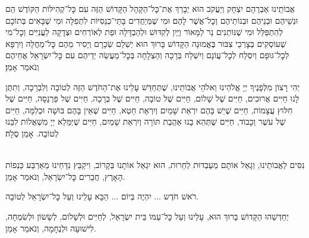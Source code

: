 \documentclass[twoside, openany, parskip=half, 11pt]{book}
\begin{document}
אֲבוֹתֵֽינוּ אַבְרָהָם יִצְחָק וְיַעֲקֹב הוּא יְבָרֵךְ אֶת־כׇּל־הַקָּהָל הַקָּדוֹשׁ הַזֶּה עִם כׇּל־קְהִילּוֹת הַקּוֹדֶשׁ הֵם וּנְשֵׁיהֶם וּבְנֵיהֶם וּבְנוֹתֵיהֶם וְכׇל־אֲשֶׁר לָהֶם׃ וּמִי שֶׁמְּיַחֲדִים בָּתֵּי־כְנֵסִיּוֹת לִתְפִלָּה וּמִי שֶׁבָּאִים בְּתוֹכָם לְהִתְפַּלֵּל וּמִי שֶׁנּוֹתְנִים נֵר לַמָּאוֹר וְיַֽיִן לְקִדּוּשׁ וּלְהַבְדָּלָה וּפַת לְאוֹרְחִים וּצְדָקָה לַעֲנִיִּים וְכׇל־מִי שֶׁעוֹסְקִים בְּצׇרְכֵי צִבּוּר בֶּאֱמוּנָה הַקָּדוֹשׁ בָּרוּךְ הוּא יְשַׁלֵם שְׂכָרָם וְיָסִיר מֵהֶם כׇּל־מַחֲלָה וְיִרְפָּא לְכׇל־גּוּפָם וְיִסְלַח לְכׇל־עֲוֹנָם וְיִשְׁלַח בְּרָכָה וְהַצְלָחָה בְּכׇל־מַעֲשֵׂה יְדֵיהֶם עִם כׇּל־יִשְׂרָאֵל אֲחֵיהֶם וְנֹאמַר אָמֵן׃


יְהִי רָצוֹן מִלְּפָנֶיךָ יְיָ אֱלֹהֵינוּ וֵאלֹהֵי אֲבוֹתֵינוּ,
שֶׁתְּחַדֵּשׁ עָלֵינוּ אֶת־הַחֹדֶשׁ הַזֶּה לְטוֹבָה וְלִבְרָכָה,
וְתִתֶּן לָנוּ חַיִּים אֲרוּכִים,
חַיִּים שֶׁל שָׁלוֹם,
חַיִּים שֶׁל טוֹבָה,
חַיִּים שֶׁל בְּרָכָה,
חַיִּים שֶׁל פַּרְנָסָה,
חַיִּים שֶׁל חִלּוּץ עֲצָמוֹת,
חַיִּים שֶׁיֵשׁ בָּהֶם יִרְאַת שָׁמַיִם וְיִרְאַת חֵטְא,
חַיִּים שֶׁאֵין בָּהֶם בּוּשָׁה וּכְלִמָּה,
חַיִּים שֶׁל עשֶׁר וְכָבוֹד,
חַיִּים שֶׁתְּהֵא בָנוּ אַהֲבַת תּוֹרָה וְיִרְאַת שָׁמַיִם,
חַיִּים שֶׁיְּמַּלֵא יְיָ מִשְׁאֲלוֹת לִבֵּנוּ לְטוֹבָה. אָמֵן סֶלָה׃

\\
נִסִּים לַאֲבוֹתֵינוּ, וְגָאַל אוֹתָם מֵעַבְדוּת לְחֵרוּת, הוּא יִגְאַל אוֹתָנוּ בְּקָרוֹב, וִיקַבֵּץ נִדָּחֵינוּ מֵאַרְבַּע כַּנְפוֹת הָאָרֶץ, חֲבֵרִים כׇּל־יִשְׂרָאֵל, וְנֹאמַר אָמֵן.

רֹאשׁ חֹדֶש ... יִהְיֶה בְּיוֹם ... הַבָּא עָלֵינוּ וְעַל כׇּל־יִשְׂרָאֵל לְטוֹבָה.

יְחַדְּשֵׁהוּ הַקָּדוֹשׁ בָּרוּךְ הוּא, עָלֵינוּ וְעַל כׇּל־עַמּוֹ בֵּית יִשְׂרָאֵל, לְחַיִּים וּלְשָׁלוֹם, לְשָׂשׂוֹן וּלְשִׂמְחָה, לִישׁוּעָה וּלְנֶחָמָה, וְנֹאמַר אָמֵן.
\end{document}
